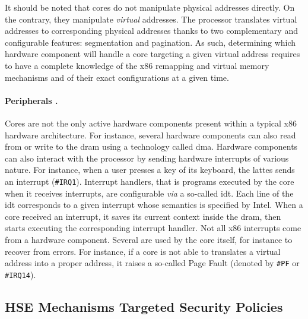 It should be noted that cores do not manipulate physical addresses directly.
%
On the contrary, they manipulate \emph{virtual} addresses.
%
The processor translates virtual addresses to corresponding physical addresses
thanks to two complementary and configurable features: segmentation and
pagination.
%
As such, determining which hardware component will handle a core \IO targeting a
given virtual address requires to have a complete knowledge of the x86 remapping
and virtual memory mechanisms and of their exact configurations at a given time.

\paragraph{Peripherals \IOs.}
%
Cores are not the only active hardware components present within a typical x86
hardware architecture.
%
For instance, several hardware components can also read from or write to the
\ac{dram} using a technology called \ac{dma}.
%
Hardware components can also interact with the processor by sending hardware
interrupts of various nature.
%
For instance, when a user presses a key of its keyboard, the lattes sends an
interrupt (\texttt{\#IRQ1}).
%
Interrupt handlers, that is programs executed by the core when it receives
interrupts, are configurable \emph{via} a so-called \ac{idt}.
%
Each line of the \ac{idt} corresponds to a given interrupt whose semantics is
specified by Intel.
%
When a core received an interrupt, it saves its current context inside the
\ac{dram}, then starts executing the corresponding interrupt handler.
%
Not all x86 interrupts come from a hardware component.
%
Several are used by the core itself, for instance to recover from errors.
%
For instance, if a core is not able to translates a virtual address into a
proper address, it raises a so-called Page Fault (denoted by \texttt{\#PF} or
\texttt{\#IRQ14}).

\subsection{HSE Mechanisms Targeted Security Policies}

